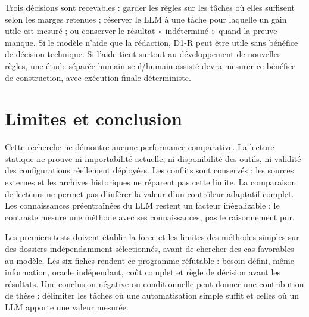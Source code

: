 \documentclass[11pt,a4paper]{article}
\begin{document}
Trois décisions sont recevables : garder les règles sur les tâches où elles
suffisent selon les marges retenues ; réserver le LLM à une tâche pour laquelle
un gain utile est mesuré ; ou conserver le résultat « indéterminé » quand la
preuve manque. Si le modèle n'aide que la rédaction, D1-R peut être utile
sans bénéfice de décision technique. Si l'aide tient surtout au développement
de nouvelles règles, une étude séparée humain seul/humain assisté devra mesurer
ce bénéfice de construction, avec exécution finale déterministe.

\section{Limites et conclusion}
Cette recherche ne démontre aucune performance comparative. La lecture statique
ne prouve ni importabilité actuelle, ni disponibilité des outils, ni validité
des configurations réellement déployées. Les conflits sont conservés ; les
sources externes et les archives historiques ne réparent pas cette limite.
La comparaison de lecteurs ne permet pas d'inférer la valeur d'un contrôleur
adaptatif complet. Les connaissances préentraînées du LLM restent un facteur
inégalizable : le contraste mesure une méthode avec ses connaissances,
pas le raisonnement pur.

Les premiers tests doivent établir la force et les limites des méthodes
simples sur des dossiers indépendamment sélectionnés, avant de chercher des
cas favorables au modèle. Les six fiches rendent ce programme réfutable :
besoin défini, même information, oracle indépendant, coût complet et règle de
décision avant les résultats. Une conclusion négative ou conditionnelle peut
donner une contribution de thèse : délimiter les tâches où une automatisation
simple suffit et celles où un LLM apporte une valeur mesurée.
\end{document}
